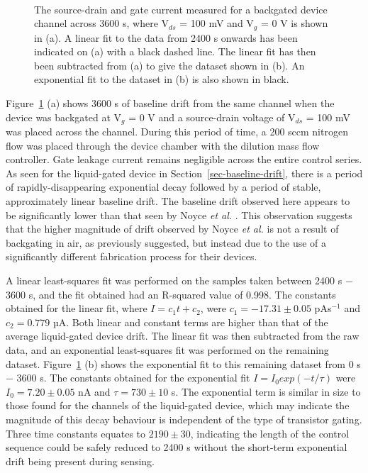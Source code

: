 \documentclass[
  a4paper,
]{scrbook}
\begin{document}
\begin{figure}
\begin{minipage}[t]{0.70\linewidth}
{}

\end{minipage}%
%
\begin{minipage}[t]{0.15\linewidth}

{\centering 

~

}

\end{minipage}%

\caption{\label{fig-bg-baseline-drift}The source-drain and gate current
measured for a backgated device channel across 3600 s, where V\(_{ds}\)
= 100 mV and V\(_g\) = 0 V is shown in (a). A linear fit to the data
from 2400 s onwards has been indicated on (a) with a black dashed line.
The linear fit has then been subtracted from (a) to give the dataset
shown in (b). An exponential fit to the dataset in (b) is also shown in
black.}

\end{figure}

Figure~\ref{fig-bg-baseline-drift} (a) shows 3600 s of baseline drift
from the same channel when the device was backgated at V\(_g\) = 0 V and
a source-drain voltage of V\(_{ds}\) = 100 mV was placed across the
channel. During this period of time, a 200 sccm nitrogen flow was placed
through the device chamber with the dilution mass flow controller. Gate
leakage current remains negligible across the entire control series. As
seen for the liquid-gated device in Section~\ref{sec-baseline-drift},
there is a period of rapidly-disappearing exponential decay followed by
a period of stable, approximately linear baseline drift. The baseline
drift observed here appears to be significantly lower than that seen by
Noyce \emph{et al.} \autocite{Noyce2019}. This observation suggests that
the higher magnitude of drift observed by Noyce \emph{et al.} is not a
result of backgating in air, as previously suggested, but instead due to
the use of a significantly different fabrication process for their
devices.

A linear least-squares fit was performed on the samples taken between
2400 s \(-\) 3600 s, and the fit obtained had an R-squared value of
0.998. The constants obtained for the linear fit, where
\(I = c_1t + c_2\), were \(c_1 = -17.31\pm0.05\) pAs\(^{-1}\) and
\(c_2 = 0.779\) µA. Both linear and constant terms are higher than that
of the average liquid-gated device drift. The linear fit was then
subtracted from the raw data, and an exponential least-squares fit was
performed on the remaining dataset. Figure~\ref{fig-bg-baseline-drift}
(b) shows the exponential fit to this remaining dataset from 0 s \(-\)
3600 s. The constants obtained for the exponential fit
\(I = I_0exp(-t/\tau)\) were \(I_0 = 7.20 \pm 0.05\) nA and
\(\tau = 730 \pm 10\) s. The exponential term is similar in size to
those found for the channels of the liquid-gated device, which may
indicate the magnitude of this decay behaviour is independent of the
type of transistor gating. Three time constants equates to
\(2190 \pm 30\), indicating the length of the control sequence could be
safely reduced to 2400 s without the short-term exponential drift being
present during sensing.
\end{document}
